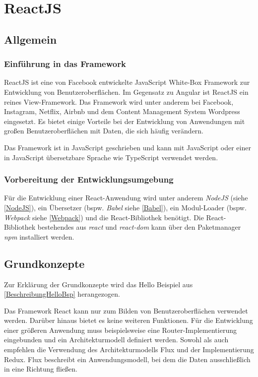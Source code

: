 \chapter{ReactJS}
\label{ch:reactJS}

\section{Allgemein}

\subsection{Einführung in das Framework}\label{sec:rEinf}
ReactJS ist eine von Facebook entwickelte JavaScript White-Box Framework zur Entwicklung von Benutzeroberflächen. Im Gegensatz zu Angular ist ReactJS ein reines View-Framework. Das Framework wird unter anderem bei Facebook, Instagram, Netflix, Airbnb und dem Content Management System Wordpress eingesetzt. Es bietet einige Vorteile bei der Entwicklung von Anwendungen mit großen Benutzeroberflächen mit Daten, die sich häufig verändern. 

Das Framework ist in JavaScript geschrieben und kann mit JavaScript oder einer in JavaScript übersetzbare Sprache wie TypeScript verwendet werden.\autocites[vgl.][1\psqq]{Gackenheimer.2015}[vgl.][3\psqq]{Zeigermann.2016}

\subsection{Vorbereitung der Entwicklungsumgebung}\label{sec:rEntw}
Für die Entwicklung einer React-Anwendung wird unter anderem \textit{NodeJS} (siehe \autoref{NodeJS}), ein Übersetzer (bspw. \textit{Babel} siehe \autoref{Babel}), ein Modul-Loader (bspw. \textit{Webpack} siehe \autoref{Webpack}) und die React-Bibliothek benötigt. Die React-Bibliothek bestehendes aus \textit{react} und \textit{react-dom} kann über den Paketmanager \textit{npm} installiert werden. \autocites[vgl.][92\psqq]{Stefanov.2017}[vgl.][8\psqq]{Zeigermann.2016}

\section{Grundkonzepte}
Zur Erklärung der Grundkonzepte wird das Hello Beispiel aus \autoref{BeschreibungHelloBsp} herangezogen.

Das Framework React kann nur zum Bilden von Benutzeroberflächen verwendet werden. Darüber hinaus bietet es keine weiteren Funktionen. Für die Entwicklung einer größeren Anwendung muss beispielsweise eine Router-Implementierung eingebunden und ein Architekturmodell definiert werden.
Sowohl \textcite{Zeigermann.2016} als auch \textcite{Stefanov.2017} empfehlen die Verwendung des Architekturmodells Flux und der Implementierung Redux. Flux beschreibt ein Anwendungsmodell, bei dem die Daten ausschließlich in eine Richtung fließen. \autocites[vgl.][8]{Zeigermann.2016}[vgl.][11]{Zeigermann.2016}[vgl.][167]{Stefanov.2017} 

